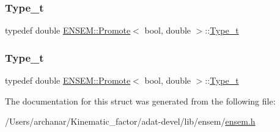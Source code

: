 \mbox{\label{structENSEM_1_1Promote_3_01bool_00_01double_01_4_ab5d5c27404016e2042b9c4312b087193}} 
\subsubsection{\texorpdfstring{Type\_t}{Type\_t}\hspace{0.1cm}{\footnotesize\ttfamily [2/3]}}
{\footnotesize\ttfamily typedef double \mbox{\hyperlink{structENSEM_1_1Promote}{E\+N\+S\+E\+M\+::\+Promote}}$<$ bool, double $>$\+::\mbox{\hyperlink{structENSEM_1_1Promote_3_01bool_00_01double_01_4_ab5d5c27404016e2042b9c4312b087193}{Type\+\_\+t}}}

\mbox{\label{structENSEM_1_1Promote_3_01bool_00_01double_01_4_ab5d5c27404016e2042b9c4312b087193}} 
\subsubsection{\texorpdfstring{Type\_t}{Type\_t}\hspace{0.1cm}{\footnotesize\ttfamily [3/3]}}
{\footnotesize\ttfamily typedef double \mbox{\hyperlink{structENSEM_1_1Promote}{E\+N\+S\+E\+M\+::\+Promote}}$<$ bool, double $>$\+::\mbox{\hyperlink{structENSEM_1_1Promote_3_01bool_00_01double_01_4_ab5d5c27404016e2042b9c4312b087193}{Type\+\_\+t}}}



The documentation for this struct was generated from the following file\+:\begin{DoxyCompactItemize}
\item 
/\+Users/archanar/\+Kinematic\+\_\+factor/adat-\/devel/lib/ensem/\mbox{\hyperlink{adat-devel_2lib_2ensem_2ensem_8h}{ensem.\+h}}\end{DoxyCompactItemize}
